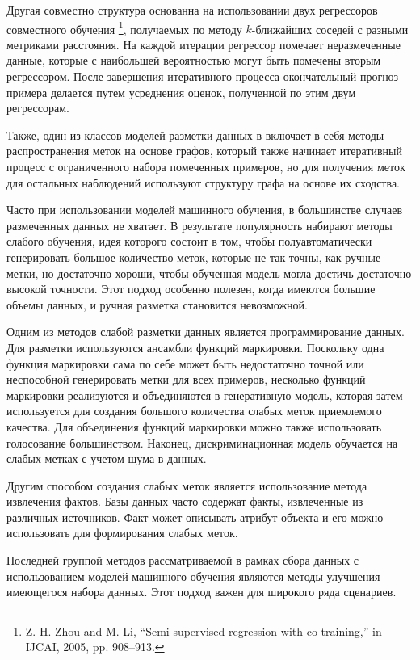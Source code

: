 \documentclass[12pt,a4paper, oneside]{extreport}
\begin{document}
Другая совместно структура основанна на использовании двух    регрессоров  совместного  обучения \footnote{Z.-H. Zhou and M. Li, “Semi-supervised regression with co-training,” in IJCAI, 2005, pp. 908–913.},  получаемых по методу $k$-ближайших соседей с разными метриками расстояния. На каждой итерации регрессор помечает неразмеченные данные, которые с наибольшей вероятностью могут быть помечены вторым регрессором. После завершения итеративного процесса  окончательный прогноз примера делается путем усреднения оценок, полученной по  этим двум регрессорам. 

Также, один из классов моделей разметки данных в включает в себя методы распространения меток на основе графов, который  также начинает итеративный процесс с ограниченного набора помеченных примеров, но для получения меток для остальных наблюдений  используют структуру графа на основе их сходства. 

Часто при использовании моделей машинного  обучения, в большинстве случаев размеченных данных не хватает. В результате популярность набирают методы слабого обучения, идея которого  состоит в том, чтобы полуавтоматически генерировать большое количество меток, которые не так точны, как ручные метки, но достаточно хороши, чтобы обученная модель могла достичь  достаточно высокой точности. Этот подход особенно полезен, когда имеются большие объемы данных, и ручная разметка становится невозможной. 

Одним из методов слабой разметки данных является программирование данных. Для разметки используются ансамбли функций маркировки.   Поскольку одна функция маркировки сама по себе может быть недостаточно точной или неспособной генерировать метки для всех примеров, несколько функций маркировки реализуются и объединяются в генеративную модель, которая затем используется для создания большого количества слабых меток приемлемого качества. 
Для объединения функций маркировки можно также  использовать голосование большинством. Наконец, дискриминационная  модель обучается на слабых метках с учетом шума в данных. 


Другим способом создания слабых меток является использование метода  извлечения фактов. Базы данных часто  содержат факты, извлеченные из различных источников. Факт может описывать атрибут объекта и его можно использовать для формирования слабых меток. 


Последней группой методов рассматриваемой в рамках сбора данных с использованием моделей машинного обучения являются  методы улучшения имеющегося набора данных. 
Этот подход важен для широкого ряда сценариев. 
\end{document}
